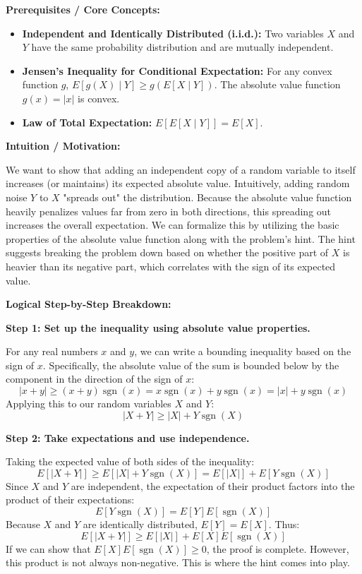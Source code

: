 \begin{solution}
\textbf{Prerequisites / Core Concepts:}
\begin{itemize}
    \item \textbf{Independent and Identically Distributed (i.i.d.):} Two variables $X$ and $Y$ have the same probability distribution and are mutually independent.
    \item \textbf{Jensen's Inequality for Conditional Expectation:} For any convex function $g$, $E[g(X) \mid Y] \geq g(E[X \mid Y])$. The absolute value function $g(x) = |x|$ is convex.
    \item \textbf{Law of Total Expectation:} $E[E[X \mid Y]] = E[X]$.
\end{itemize}

\textbf{Intuition / Motivation:}

We want to show that adding an independent copy of a random variable to itself increases (or maintains) its expected absolute value. Intuitively, adding random noise $Y$ to $X$ "spreads out" the distribution. Because the absolute value function heavily penalizes values far from zero in both directions, this spreading out increases the overall expectation. We can formalize this by utilizing the basic properties of the absolute value function along with the problem's hint. The hint suggests breaking the problem down based on whether the positive part of $X$ is heavier than its negative part, which correlates with the sign of its expected value.

\textbf{Logical Step-by-Step Breakdown:}

\textbf{Step 1: Set up the inequality using absolute value properties.}

For any real numbers $x$ and $y$, we can write a bounding inequality based on the sign of $x$. Specifically, the absolute value of the sum is bounded below by the component in the direction of the sign of $x$:
\[ |x+y| \geq (x+y) \operatorname{sgn}(x) = x \operatorname{sgn}(x) + y \operatorname{sgn}(x) = |x| + y \operatorname{sgn}(x) \]
Applying this to our random variables $X$ and $Y$:
\[ |X+Y| \geq |X| + Y \operatorname{sgn}(X) \]

\textbf{Step 2: Take expectations and use independence.}

Taking the expected value of both sides of the inequality:
\[ E[|X+Y|] \geq E[|X| + Y \operatorname{sgn}(X)] = E[|X|] + E[Y \operatorname{sgn}(X)] \]
Since $X$ and $Y$ are independent, the expectation of their product factors into the product of their expectations:
\[ E[Y \operatorname{sgn}(X)] = E[Y] E[\operatorname{sgn}(X)] \]
Because $X$ and $Y$ are identically distributed, $E[Y] = E[X]$. Thus:
\[ E[|X+Y|] \geq E[|X|] + E[X] E[\operatorname{sgn}(X)] \]
If we can show that $E[X] E[\operatorname{sgn}(X)] \geq 0$, the proof is complete. However, this product is not always non-negative. This is where the hint comes into play.


\end{solution}
